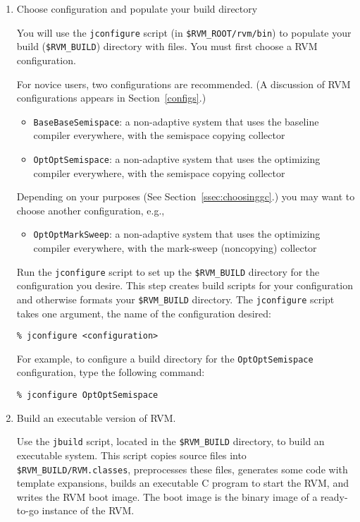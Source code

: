 \begin{enumerate}
\item Choose configuration and populate your build directory

You will use the {\tt jconfigure} script (in {\tt \$RVM\_ROOT/rvm/bin}) to
populate your build ({\tt \$RVM\_BUILD}) directory with files.  You must
first choose a RVM configuration.

For novice users, two configurations are recommended.  (A discussion
of RVM configurations appears in Section~\ref{configs}.)

\begin{itemize}
\item {\tt BaseBaseSemispace}: a non-adaptive system that uses the
baseline compiler everywhere, with the semispace copying collector
\item {\tt OptOptSemispace}: a non-adaptive system that uses the
optimizing compiler everywhere, with the semispace copying collector
\end{itemize}

Depending on your purposes (See Section~\ref{ssec:choosinggc}.) you
may want to choose another configuration, e.g.,
\begin{itemize}
\item {\tt OptOptMarkSweep}: a non-adaptive system that uses the
optimizing  compiler everywhere, with the mark-sweep (noncopying) collector
\end{itemize}

Run the {\tt jconfigure} script to set up the {\tt \$RVM\_BUILD}
directory for the configuration you desire.  This step creates
build scripts for your configuration and otherwise formats your
{\tt \$RVM\_BUILD} directory.
The {\tt jconfigure} script takes one argument, the name of the
configuration desired: 

\begin{verbatim}
% jconfigure <configuration>
\end{verbatim}

For example, to configure a build 
directory for the {\tt OptOptSemispace} configuration, type
the following command:

\begin{verbatim}
% jconfigure OptOptSemispace
\end{verbatim}

\item Build an executable version of RVM.  

Use the {\tt jbuild} script, located in the {\tt \$RVM\_BUILD} directory,
to build an executable system.  This script copies source files into
{\tt \$RVM\_BUILD/RVM.classes}, preprocesses these files, generates
some code with template expansions, builds an executable C program to
start the RVM, and writes the RVM boot image.  The boot image is the
binary image of a ready-to-go instance of the RVM.


\end{enumerate}

